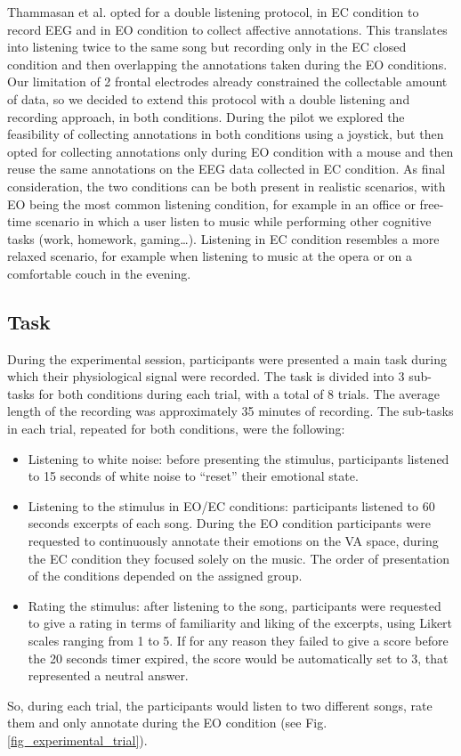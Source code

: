 Thammasan et al. \cite{thammasan_continuous_2016} opted for a double listening protocol, in \ac{EC} condition to record \ac{EEG} and in \ac{EO} condition to collect affective annotations. This translates into listening twice to the same song but recording only in the \ac{EC} closed condition and then overlapping the annotations taken during the \ac{EO} conditions. Our limitation of 2 frontal electrodes already constrained the collectable amount of data, so we decided to extend this protocol with a double listening and recording approach, in both conditions. During the pilot we explored the feasibility of collecting annotations in both conditions using a joystick, but then opted for collecting annotations only during \ac{EO} condition with a mouse and then reuse the same annotations on the \ac{EEG} data collected in \ac{EC} condition.  As final consideration, the two conditions can be both present in realistic scenarios, with \ac{EO} being the most common listening condition, for example in an office or free-time scenario in which a user listen to music while performing other cognitive tasks (work, homework, gaming…). Listening in \ac{EC} condition resembles a more relaxed scenario, for example when listening to music at the opera or on a comfortable couch in the evening.

\subsection{Task}
\label{sec:task}
During the experimental session, participants were presented a main task during which their physiological signal were recorded. The task is divided into 3 sub-tasks for both conditions during each trial, with a total of 8 trials. The average length of the recording was approximately 35 minutes of recording. The sub-tasks in each trial, repeated for both conditions, were the following:

\begin{itemize}
\item Listening to white noise: before presenting the stimulus, participants listened to 15 seconds of white noise to “reset” their emotional state.
\item Listening to the stimulus in EO/EC conditions: participants listened to 60 seconds excerpts of each song. During the \ac{EO} condition participants were requested to continuously annotate their emotions on the \ac{VA} space, during the \ac{EC} condition they focused solely on the music. The order of presentation of the conditions depended on the assigned group.
\item Rating the stimulus: after listening to the song, participants were requested to give a rating in terms of familiarity and liking of the excerpts, using Likert scales ranging from 1 to 5. If for any reason they failed to give a score before the 20 seconds timer expired, the score would be automatically set to 3, that represented a neutral answer.
\end{itemize}
So, during each trial, the participants would listen to two different songs, rate them and only annotate during the \ac{EO} condition (see Fig. \ref{fig_experimental_trial}). 

